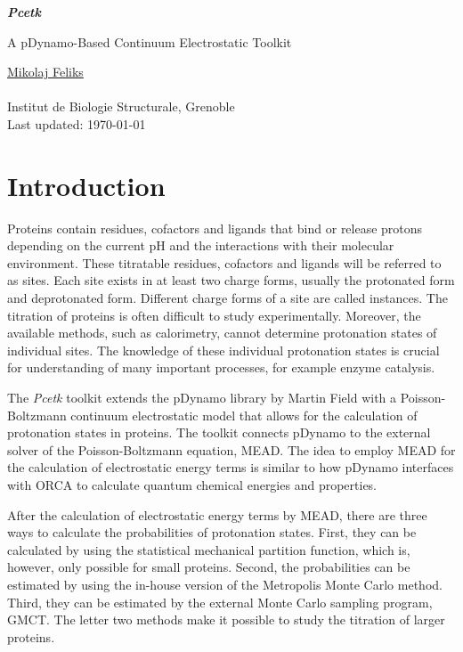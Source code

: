 \documentclass[12pt]{article}
\newcommand{\modulename}{\textit{Pcetk}\xspace}
\begin{document}
\begin{center}
{\LARGE \bf \modulename}

{\normalsize
A pDynamo-Based Continuum Electrostatic Toolkit

\vspace{1.0cm}
\underline{Mikolaj Feliks}\\
\\
Institut de Biologie Structurale, Grenoble\\

Last updated: \today
}

\vspace{0.5cm}
\end{center}


\section{Introduction}
Proteins contain residues, cofactors and ligands that bind or release protons
depending on the current pH and the interactions with their molecular
environment\cite{Ullmann1999}.
%
These titratable residues, cofactors and ligands will be referred to as sites.
%
Each site exists in at least two charge forms, usually the protonated form and
deprotonated form.
%
Different charge forms of a site are called instances.
%
The titration of proteins is often difficult to study experimentally.
%
Moreover,
the available methods, such as calorimetry, cannot determine protonation states
of individual sites.
%
The knowledge of these individual protonation states is crucial for
understanding of many important processes, for example enzyme catalysis\cite{Bombarda2010}.


The \modulename toolkit extends the pDynamo library by
Martin Field\cite{pDynamo_Field2008}  with a Poisson-Boltz\-mann continuum electrostatic
model that allows for the calculation of protonation states
in proteins\cite{Bashford1992,Ullmann1999,Bombarda2006}.
%
The toolkit
connects pDynamo to the external solver of the Poisson-Boltzmann
equation, MEAD\cite{Bashford1997}.
%
The idea to employ MEAD for the calculation of electrostatic energy terms
is similar to how pDynamo interfaces with ORCA to calculate
quantum chemical energies and properties.
%

After the calculation of electrostatic energy terms by MEAD,
there are three ways to calculate the probabilities of protonation states.
%
First,
they can be calculated by using the statistical mechanical partition function,
which is, however, only possible for small proteins.
%
Second,
the probabilities can be estimated by using the in-house version of
the Metropolis Monte Carlo method\cite{Beroza1991}.
%
Third,
they can be estimated by the external Monte Carlo sampling program,
GMCT\cite{Ullmann2012,Thomas_PhD}.
%
The letter two methods make it possible to study the titration
of larger proteins.
\end{document}
